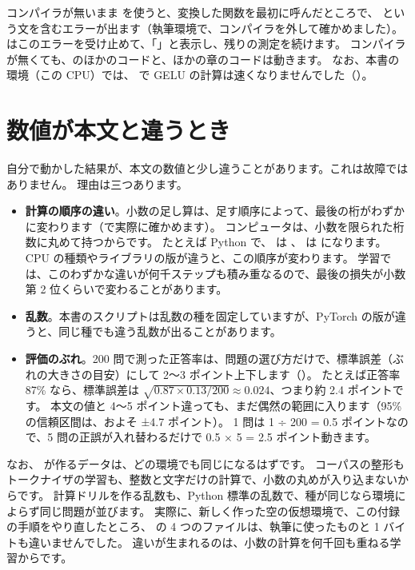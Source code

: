 コンパイラが無いまま  を使うと、変換した関数を最初に呼んだところで、 という文を含むエラーが出ます（執筆環境で、コンパイラを外して確かめました）。
 はこのエラーを受け止めて、「」と表示し、残りの測定を続けます。
コンパイラが無くても、のほかのコードと、ほかの章のコードは動きます。
なお、本書の環境（この CPU）では、 で GELU の計算は速くなりませんでした（）。

\section{数値が本文と違うとき}\label{sec:setup-repro}

自分で動かした結果が、本文の数値と少し違うことがあります。これは故障ではありません。
理由は三つあります。

\begin{itemize}
\item \textbf{計算の順序の違い}。小数の足し算は、足す順序によって、最後の桁がわずかに変わります（で実際に確かめます）。
  コンピュータは、小数を限られた桁数に丸めて持つからです。
  たとえば Python で、 は 、 は  になります。
  CPU の種類やライブラリの版が違うと、この順序が変わります。
  学習では、このわずかな違いが何千ステップも積み重なるので、最後の損失が小数第 2 位くらいで変わることがあります。
\item \textbf{乱数}。本書のスクリプトは乱数の種を固定していますが、PyTorch の版が違うと、同じ種でも違う乱数が出ることがあります。
\item \textbf{評価のぶれ}。200 問で測った正答率は、問題の選び方だけで、標準誤差（ぶれの大きさの目安）にして 2〜3 ポイント上下します（）。
  たとえば正答率 87\% なら、標準誤差は $\sqrt{0.87\times0.13/200}\approx0.024$、つまり約 2.4 ポイントです。
  本文の値と 4〜5 ポイント違っても、まだ偶然の範囲に入ります（95\% の信頼区間は、およそ ±4.7 ポイント）。
  1 問は 1 ÷ 200 = 0.5 ポイントなので、5 問の正誤が入れ替わるだけで 0.5 × 5 = 2.5 ポイント動きます。
\end{itemize}

なお、 が作るデータは、どの環境でも同じになるはずです。
コーパスの整形もトークナイザの学習も、整数と文字だけの計算で、小数の丸めが入り込まないからです。
計算ドリルを作る乱数も、Python 標準の乱数で、種が同じなら環境によらず同じ問題が並びます。
実際に、新しく作った空の仮想環境で、この付録の手順をやり直したところ、 の 4 つのファイルは、執筆に使ったものと 1 バイトも違いませんでした。
違いが生まれるのは、小数の計算を何千回も重ねる学習からです。

